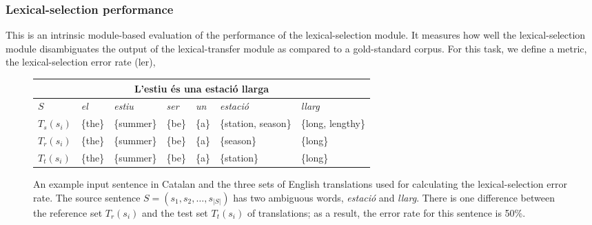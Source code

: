 \documentclass[11pt]{article}
\begin{document}
\subsubsection{Lexical-selection performance}
This is an intrinsic module-based evaluation of the performance of the
lexical-selection module.  It measures how well the lexical-selection
module disambiguates the output of the lexical-transfer module as
compared to a gold-standard corpus. For this task, we define a metric,
the lexical-selection error rate ({\sc ler}),
\begin{figure}
\begin{center}
\setlength\tabcolsep{5.2pt}%
 \begin{tabular}{|l|llllll|}
   \hline
   \multicolumn{7}{|c|}{L'estiu \'{e}s una estaci\'{o} llarga}\\
   \hline
   $S$        & \emph{el} & \emph{estiu} & \emph{ser} & \emph{un} & \emph{estaci\'{o}} & \emph{llarg} \\
   \hline
   $T_s(s_i)$ & \{the\} & \{summer\} & \{be\} & \{a\} & \{station, season\} &  \{long, lengthy\} \\
   \hline 
   $T_r(s_i)$ & \{the\} & \{summer\} & \{be\} & \{a\} &  \{season\} & \{long\} \\
   \hline
   $T_t(s_i)$ & \{the\} & \{summer\} & \{be\} & \{a\} &  \{station\} & \{long\} \\
   \hline
 \end{tabular}
 \caption{An example input sentence in Catalan and the three sets of
   English translations used for calculating the lexical-selection
   error rate. The source sentence $S = (s_1, s_2, \ldots, s_{|S|})$
   has two ambiguous words, \emph{estaci\'{o}} and \emph{llarg}. There is one difference
   between the reference set $T_r(s_i)$ and the test set $T_t(s_i)$ of
   translations; as a result, the error rate for this sentence is
   50\%.}
\label{fig:ler-example}
\end{center}
\end{figure}

\end{document}
